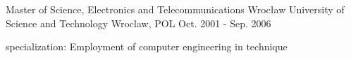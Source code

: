 

\begin{cventries}

  \cventry
    {Master of Science, Electronics and Telecommunications} %
    {Wrocław University of Science and Technology} %
    {Wroclaw, POL} %
    {Oct. 2001 - Sep. 2006} %
    {
      \begin{cvitems} %
        \item {specialization: Employment of computer engineering in technique}
      \end{cvitems}
    }

\end{cventries}

